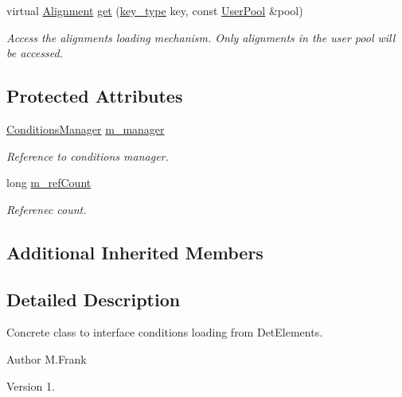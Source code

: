 \begin{DoxyCompactItemize}
virtual \hyperlink{class_d_d4hep_1_1_conditions_1_1_alignments_loader_imp_a2af19e971736ac6856523194f7eb717a}{Alignment} \hyperlink{class_d_d4hep_1_1_conditions_1_1_alignments_loader_imp_ab37a7e41559862d5c424fcad50bb6768}{get} (\hyperlink{class_d_d4hep_1_1_alignments_1_1_alignments_loader_af56e6294e72dacbe001c1f24b8381d5d}{key\+\_\+type} key, const \hyperlink{class_d_d4hep_1_1_conditions_1_1_user_pool}{User\+Pool} \&pool)
\begin{DoxyCompactList}\small\item\em Access the alignments loading mechanism. Only alignments in the user pool will be accessed. \end{DoxyCompactList}\end{DoxyCompactItemize}
\subsection*{Protected Attributes}
\begin{DoxyCompactItemize}
\item 
\hyperlink{class_d_d4hep_1_1_conditions_1_1_conditions_manager}{Conditions\+Manager} \hyperlink{class_d_d4hep_1_1_conditions_1_1_alignments_loader_imp_a448202e08fc26fb95d13fd86993b3685}{m\+\_\+manager}
\begin{DoxyCompactList}\small\item\em Reference to conditions manager. \end{DoxyCompactList}\item 
long \hyperlink{class_d_d4hep_1_1_conditions_1_1_alignments_loader_imp_a806e6a616a116ada0a4a9876c0cc1119}{m\+\_\+ref\+Count}
\begin{DoxyCompactList}\small\item\em Referenec count. \end{DoxyCompactList}\end{DoxyCompactItemize}
\subsection*{Additional Inherited Members}


\subsection{Detailed Description}
Concrete class to interface conditions loading from Det\+Elements. 

\begin{DoxyAuthor}{Author}
M.\+Frank 
\end{DoxyAuthor}
\begin{DoxyVersion}{Version}
1. 
\end{DoxyVersion}


